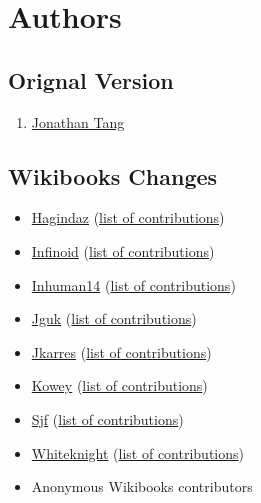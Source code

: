 \section{Authors}
\label{sec:authors}
 
\subsection{Orignal Version}
\begin{enumerate}
	\item \href{http://halogen.note.amherst.edu/~jdtang/}{Jonathan Tang}
\end{enumerate}
 
\subsection{Wikibooks Changes}
\begin{itemize}
	\item \href{http://en.wikibooks.org/wiki/User:Hagindaz}{Hagindaz} (\href{http://en.wikibooks.org/wiki/Special:Contributions/Hagindaz}{list of contributions}) 
	\item \href{http://en.wikibooks.org/wiki/User:Infinoid}{Infinoid} (\href{http://en.wikibooks.org/wiki/Special:Contributions/Infinoid}{list of contributions})
	\item \href{http://en.wikibooks.org/wiki/User:Inhuman14}{Inhuman14} (\href{http://en.wikibooks.org/wiki/Special:Contributions/Inhuman14}{list of contributions})
	\item \href{http://en.wikibooks.org/wiki/User:Jguk}{Jguk} (\href{http://en.wikibooks.org/wiki/Special:Contributions/Jguk}{list of contributions})
	\item \href{http://en.wikibooks.org/wiki/User:Jkarres}{Jkarres} (\href{http://en.wikibooks.org/wiki/Special:Contributions/Jkarres}{list of contributions})
	\item \href{http://en.wikibooks.org/wiki/User:Kowey}{Kowey} (\href{http://en.wikibooks.org/wiki/Special:Contributions/Kowey}{list of contributions})
	\item \href{http://en.wikibooks.org/wiki/User:Sjf}{Sjf} (\href{http://en.wikibooks.org/wiki/Special:Contributions/Sjf}{list of contributions})
	\item \href{http://en.wikibooks.org/wiki/User:Whiteknight}{Whiteknight} (\href{http://en.wikibooks.org/wiki/Special:Contributions/Whiteknight}{list of contributions})
	\item Anonymous Wikibooks contributors
\end{itemize}

